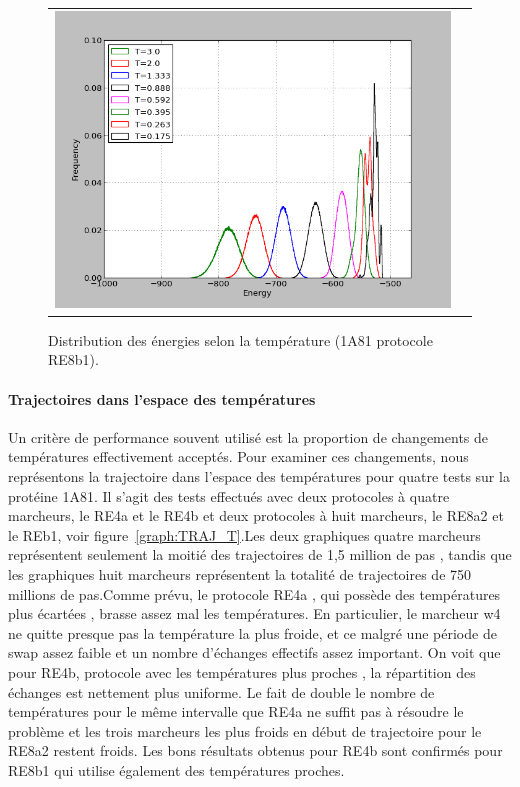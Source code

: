    \begin{figure}[t]
     \centering
     \begin{tabular}{cc}
       \includegraphics[width=12cm]{graphe/1A81_RE8b1.png} &
     \end{tabular}
     
     \caption{Distribution des énergies selon la température (1A81 protocole RE8b1).}
\label{graph:Distrib_E_T}
   \end{figure}

\paragraph{Trajectoires dans l'espace des températures}

Un critère de performance souvent utilisé est la proportion de changements de températures effectivement acceptés. Pour examiner ces changements, nous représentons la trajectoire dans l'espace des températures pour quatre tests sur la protéine 1A81. Il s'agit des tests effectués avec deux protocoles à quatre marcheurs, le RE4a et le RE4b et deux protocoles à huit marcheurs, le RE8a2 et le REb1, voir figure~\ref{graph:TRAJ_T}.Les deux graphiques quatre marcheurs représentent seulement la moitié des trajectoires de 1,5 million de pas , tandis que les graphiques huit marcheurs représentent la totalité de trajectoires de 750 millions de pas.Comme prévu, le protocole RE4a , qui possède des températures plus écartées , brasse assez mal les températures. En particulier, le marcheur w4 ne quitte presque pas la température la plus froide, et ce malgré une période de swap assez faible et un nombre d'échanges effectifs assez important. On voit que pour RE4b, protocole avec les températures plus proches , la répartition des échanges est nettement plus uniforme. Le fait de double le nombre de températures pour le même intervalle que RE4a ne suffit pas à résoudre le problème et les trois marcheurs les plus froids en début de trajectoire pour le RE8a2 restent froids. Les bons résultats obtenus pour RE4b sont confirmés pour RE8b1 qui utilise également des températures proches.     


